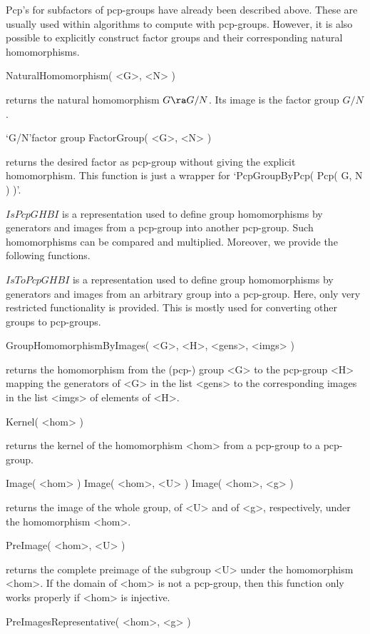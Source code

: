 Pcp's for subfactors of  pcp-groups have already been described above.
These are usually used within  algorithms to compute with  pcp-groups.
However, it is also possible to explicitly construct factor groups and
their corresponding natural homomorphisms.

\>NaturalHomomorphism( <G>, <N> )

returns  the natural homomorphism   $G \ra  G/N$.  Its image  is the
factor group $G/N$.

\>`G/N'{factor group}
\>FactorGroup( <G>, <N> )

returns  the desired factor as  pcp-group without  giving the explicit
homomorphism. This function is just a wrapper for 
`PcpGroupByPcp( Pcp( G, N ) )'.


$IsPcpGHBI$ is a representation used to  define group homomorphisms by
generators  and images from a pcp-group  into another pcp-group.  Such
homomorphisms can be compared and multiplied. Moreover, we provide the
following functions.

\bigbreak
$IsToPcpGHBI$ is a  representation used to define group  homomorphisms
by  generators and images  from an  arbitrary  group into a pcp-group.
Here,  only very restricted functionality is  provided. This is mostly
used for converting other groups to pcp-groups.

\>GroupHomomorphismByImages( <G>, <H>, <gens>, <imgs> )

returns the homomorphism from the (pcp-) group <G> to the pcp-group <H>
mapping the generators of <G> in the  list <gens> to the corresponding
images in the list <imgs> of elements of <H>.

\>Kernel( <hom> )

returns the kernel of  the homomorphism <hom> from   a pcp-group to  a
pcp-group.

\>Image( <hom> )
\>Image( <hom>, <U> )
\>Image( <hom>, <g> )

returns the image of the whole group, of <U> and of <g>, respectively,
under the homomorphism <hom>.

\>PreImage( <hom>, <U> )

returns   the  complete  preimage of    the   subgroup <U>  under  the
homomorphism <hom>.  If the domain of <hom> is  not a pcp-group, then
this function only works properly if <hom> is injective.


\>PreImagesRepresentative( <hom>, <g> )

